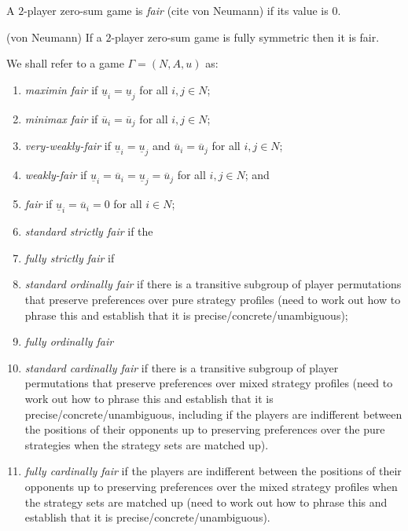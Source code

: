 \begin{definition}
	A $2$-player zero-sum game is \textit{fair} (cite von Neumann) if its value is $0$.
\end{definition}

\begin{proposition} 
	(von Neumann) If a $2$-player zero-sum game is fully symmetric then it is fair. 
\end{proposition}

\begin{definition}
	We shall refer to a game $\Gamma = (N, A, u)$ as:
	\begin{enumerate}
		\item \textit{maximin fair} if $\underline{u}_i = \underline{u}_j$ for all $i, j \in N$;
		\item \textit{minimax fair} if $\overline{u}_i = \overline{u}_j$ for all $i, j \in N$;
		\item \textit{very-weakly-fair} if $\underline{u}_i = \underline{u}_j$ and $\overline{u}_i = \overline{u}_j$ for all $i, j \in N$;
		\item \textit{weakly-fair} if $\underline{u}_i = \overline{u}_i = \underline{u}_j = \overline{u}_j$ for all $i, j \in N$; and
		\item \textit{fair} if $\underline{u}_i = \overline{u}_i = 0$ for all $i \in N$;
		\item \textit{standard strictly fair} if the 
		\item \textit{fully strictly fair} if
		\item \textit{standard ordinally fair} if there is a transitive subgroup of player permutations that preserve preferences over pure strategy profiles (need to work out how to phrase this and establish that it is precise/concrete/unambiguous);
		\item \textit{fully ordinally fair} 
		\item \textit{standard cardinally fair} if there is a transitive subgroup of player permutations that preserve preferences over mixed strategy profiles (need to work out how to phrase this and establish that it is precise/concrete/unambiguous, including if the players are indifferent between the positions of their opponents up to preserving preferences over the pure strategies when the strategy sets are matched up). 
		\item \textit{fully cardinally fair} if the players are indifferent between the positions of their opponents up to preserving preferences over the mixed strategy profiles when the strategy sets are matched up (need to work out how to phrase this and establish that it is precise/concrete/unambiguous).
	\end{enumerate}
\end{definition}


